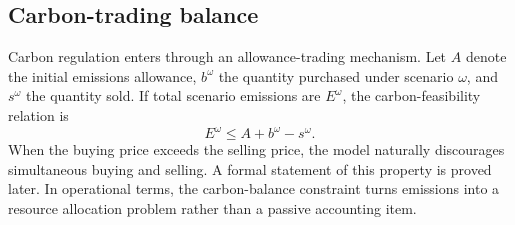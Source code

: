 \subsection{Carbon-trading balance}
Carbon regulation enters through an allowance-trading mechanism. Let $A$ denote the initial emissions allowance, $b^{\omega}$ the quantity purchased under scenario $\omega$, and $s^{\omega}$ the quantity sold. If total scenario emissions are $E^{\omega}$, the carbon-feasibility relation is
\begin{equation}
E^{\omega}\le A+b^{\omega}-s^{\omega}.
\end{equation}
When the buying price exceeds the selling price, the model naturally discourages simultaneous buying and selling. A formal statement of this property is proved later. In operational terms, the carbon-balance constraint turns emissions into a resource allocation problem rather than a passive accounting item.

